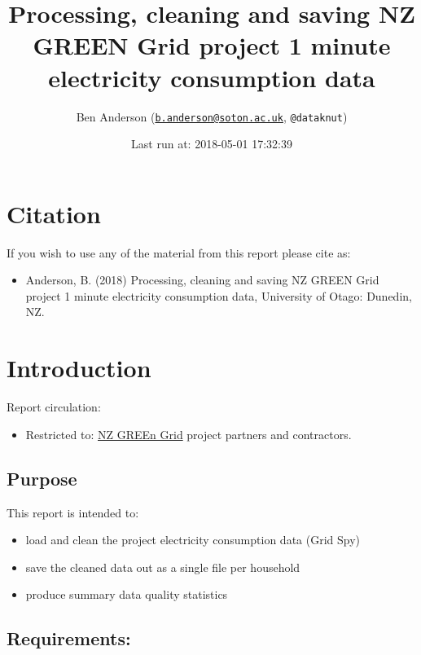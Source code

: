 \documentclass[]{article}
\title{Processing, cleaning and saving NZ GREEN Grid project 1 minute
electricity consumption data}
\author{Ben Anderson
(\href{mailto:b.anderson@soton.ac.uk}{\nolinkurl{b.anderson@soton.ac.uk}},
\texttt{@dataknut})}
\date{Last run at: 2018-05-01 17:32:39}
\providecommand{\tightlist}{%
  \setlength{\itemsep}{0pt}\setlength{\parskip}{0pt}}
\begin{document}
\maketitle

{
\setcounter{tocdepth}{2}
\tableofcontents
}
\newpage

\section{Citation}\label{citation}

If you wish to use any of the material from this report please cite as:

\begin{itemize}
\tightlist
\item
  Anderson, B. (2018) Processing, cleaning and saving NZ GREEN Grid
  project 1 minute electricity consumption data, University of Otago:
  Dunedin, NZ.
\end{itemize}

\newpage

\section{Introduction}\label{introduction}

Report circulation:

\begin{itemize}
\tightlist
\item
  Restricted to:
  \href{https://www.otago.ac.nz/centre-sustainability/research/energy/otago050285.html}{NZ
  GREEn Grid} project partners and contractors.
\end{itemize}

\subsection{Purpose}\label{purpose}

This report is intended to:

\begin{itemize}
\tightlist
\item
  load and clean the project electricity consumption data (Grid Spy)
\item
  save the cleaned data out as a single file per household
\item
  produce summary data quality statistics
\end{itemize}

\subsection{Requirements:}\label{requirements}
\end{document}
